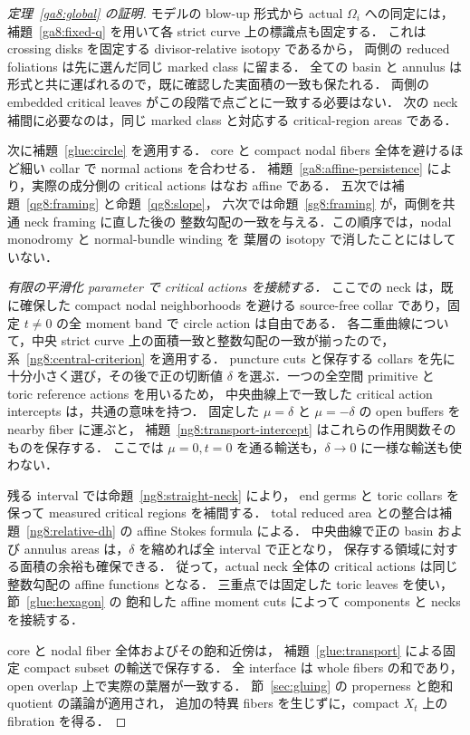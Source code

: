 \begin{proof}[定理~\ref{ga8:global} の証明]
モデルの blow-up 形式から actual $\Omega_i$ への同定には，
補題~\ref{ga8:fixed-q} を用いて各 strict curve 上の標識点も固定する．
これは crossing disks を固定する divisor-relative isotopy であるから，
両側の reduced foliations は先に選んだ同じ marked class に留まる．
全ての basin と annulus は形式と共に運ばれるので，既に確認した実面積の一致も保たれる．
両側の embedded critical leaves がこの段階で点ごとに一致する必要はない．
次の neck 補間に必要なのは，同じ marked class と対応する critical-region areas である．

次に補題~\ref{glue:circle} を適用する．
core と compact nodal fibers 全体を避けるほど細い collar で normal actions を合わせる．
補題~\ref{ga8:affine-persistence} により，実際の成分側の critical actions はなお affine である．
五次では補題~\ref{qg8:framing} と命題~\ref{qg8:slope}，
六次では命題~\ref{sg8:framing} が，両側を共通 neck framing に直した後の
整数勾配の一致を与える．この順序では，nodal monodromy と normal-bundle winding を
葉層の isotopy で消したことにはしていない．

\textit{有限の平滑化 parameter で critical actions を接続する．}
ここでの neck は，既に確保した compact nodal neighborhoods を避ける
source-free collar であり，固定 $t\ne0$ の全 moment band で circle action は自由である．
各二重曲線について，中央 strict curve 上の面積一致と整数勾配の一致が揃ったので，
系~\ref{ng8:central-criterion} を適用する．
puncture cuts と保存する collars を先に十分小さく選び，その後で正の切断値
$\delta$ を選ぶ．一つの全空間 primitive と toric reference actions を用いるため，
中央曲線上で一致した critical action intercepts は，共通の意味を持つ．
固定した $\mu=\delta$ と $\mu=-\delta$ の open buffers を nearby fiber に運ぶと，
補題~\ref{ng8:transport-intercept} はこれらの作用関数そのものを保存する．
ここでは $\mu=0,t=0$ を通る輸送も，$\delta\to0$ に一様な輸送も使わない．

残る interval では命題~\ref{ng8:straight-neck} により，
end germs と toric collars を保って measured critical regions を補間する．
total reduced area との整合は補題~\ref{ng8:relative-dh} の affine Stokes formula による．
中央曲線で正の basin および annulus areas は，$\delta$ を縮めれば全 interval で正となり，
保存する領域に対する面積の余裕も確保できる．
従って，actual neck 全体の critical actions は同じ整数勾配の affine functions となる．
三重点では固定した toric leaves を使い，節~\ref{glue:hexagon} の
飽和した affine moment cuts によって components と necks を接続する．

core と nodal fiber 全体およびその飽和近傍は，
補題~\ref{glue:transport} による固定 compact subset の輸送で保存する．
全 interface は whole fibers の和であり，open overlap 上で実際の葉層が一致する．
節~\ref{sec:gluing} の properness と飽和 quotient の議論が適用され，
追加の特異 fibers を生じずに，compact $X_t$ 上の fibration を得る．


\end{proof}
